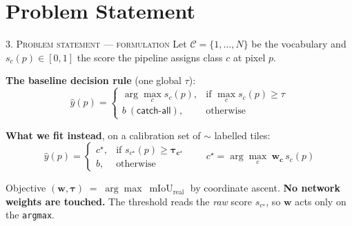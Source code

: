 \documentclass[aspectratio=169]{beamer}
\newcommand{\best}[1]{\textcolor{acc}{\textbf{#1}}}
\begin{document}
\section{Problem Statement}
\begin{frame}{\textsc{3. Problem statement --- formulation}}
Let $\mathcal{C}=\{1,\dots,N\}$ be the vocabulary and $s_c(p)\in[0,1]$ the
score the pipeline assigns class $c$ at pixel $p$.

\vspace{0.6em}
\textbf{The baseline decision rule} (one global $\tau$):
\[
  \hat{y}(p)=
  \begin{cases}
    \arg\max_{c} s_c(p), & \text{if } \max_c s_c(p) \ge \tau\\[2pt]
    b \ (\textsf{catch-all}), & \text{otherwise}
  \end{cases}
\]

\vspace{0.4em}
\textbf{What we fit instead}, on a calibration set of $\sim$\calibTiles{}
labelled tiles:
\[
  \hat{y}(p)=
  \begin{cases}
    c^\star, & \text{if } s_{c^\star}(p) \ge \boldsymbol{\tau_{c^\star}}\\
    b, & \text{otherwise}
  \end{cases}
  \qquad
  c^\star = \arg\max_{c}\ \boldsymbol{w_c}\, s_c(p)
\]

\vspace{0.5em}
\begin{block}{Objective}
$(\boldsymbol{w},\boldsymbol{\tau}) \;=\; \arg\max\ \operatorname{mIoU}_{\text{real}}$
by coordinate ascent. \best{No network weights are touched.} The threshold reads
the \emph{raw} score $s_{c^\star}$, so $\boldsymbol{w}$ acts only on the
\texttt{argmax}.
\end{block}
\end{frame}
\end{document}
